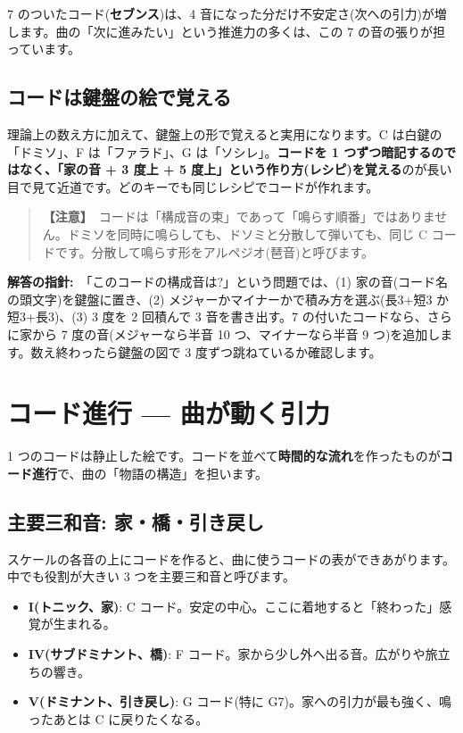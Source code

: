\documentclass{article}
\begin{document}
7 のついたコード(\textbf{セブンス})は、4 音になった分だけ不安定さ(次への引力)が増します。曲の「次に進みたい」という推進力の多くは、この 7 の音の張りが担っています。

\subsection{コードは鍵盤の絵で覚える}

理論上の数え方に加えて、鍵盤上の形で覚えると実用になります。C は白鍵の「ドミソ」、F は「ファラド」、G は「ソシレ」。\textbf{コードを 1 つずつ暗記するのではなく、「家の音 + 3 度上 + 5 度上」という作り方(レシピ)を覚える}のが長い目で見て近道です。どのキーでも同じレシピでコードが作れます。

\begin{quote}
\textbf{【注意】}\ コードは「構成音の束」であって「鳴らす順番」ではありません。ドミソを同時に鳴らしても、ドソミと分散して弾いても、同じ C コードです。分散して鳴らす形をアルペジオ(琶音)と呼びます。
\end{quote}

\textbf{解答の指針:}\ 「このコードの構成音は?」という問題では、(1) 家の音(コード名の頭文字)を鍵盤に置き、(2) メジャーかマイナーかで積み方を選ぶ(長3+短3 か 短3+長3)、(3) 3 度を 2 回積んで 3 音を書き出す。7 の付いたコードなら、さらに家から 7 度の音(メジャーなら半音 10 つ、マイナーなら半音 9 つ)を追加します。数え終わったら鍵盤の図で 3 度ずつ跳ねているか確認します。

\section{コード進行 — 曲が動く引力}

1 つのコードは静止した絵です。コードを並べて\textbf{時間的な流れ}を作ったものが\textbf{コード進行}で、曲の「物語の構造」を担います。

\subsection{主要三和音: 家・橋・引き戻し}

スケールの各音の上にコードを作ると、曲に使うコードの表ができあがります。中でも役割が大きい 3 つを主要三和音と呼びます。

\begin{itemize}
\item \textbf{I(トニック、家)}: C コード。安定の中心。ここに着地すると「終わった」感覚が生まれる。
\item \textbf{IV(サブドミナント、橋)}: F コード。家から少し外へ出る音。広がりや旅立ちの響き。
\item \textbf{V(ドミナント、引き戻し)}: G コード(特に G7)。家への引力が最も強く、鳴ったあとは C に戻りたくなる。
\end{itemize}
\end{document}
